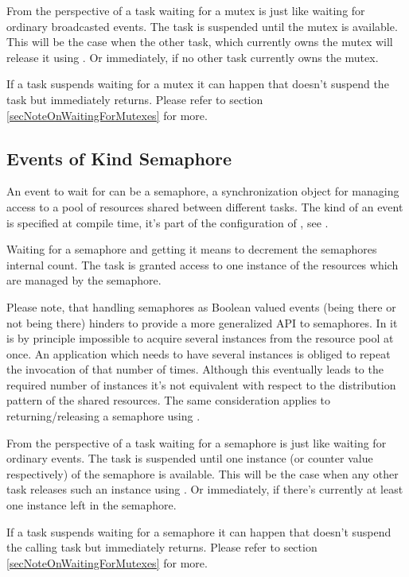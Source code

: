 From the perspective of a task waiting for a mutex is just like waiting
for ordinary broadcasted events. The task is suspended until the mutex is
available. This will be the case when the other task, which currently owns
the mutex will release it using . Or immediately, if
no other task currently owns the mutex.

If a task suspends waiting for a mutex it can happen that
 doesn't suspend the task but immediately
returns. Please refer to section \ref{secNoteOnWaitingForMutexes} for
more.


\subsection{Events of Kind Semaphore}
\label{secWaitForSemaphores}


An event to wait for can be a semaphore, a synchronization object for
managing access to a pool of resources shared between different tasks. The
kind of an event is specified at compile time, it's part of the
configuration of \rtos, see .

Waiting for a semaphore and getting it means to decrement the semaphores
internal count. The task is granted access to one instance of the
resources which are managed by the semaphore.

Please note, that handling semaphores as Boolean valued events (being
there or not being there) hinders to provide a more generalized API to
semaphores. In \rtos{} it is by principle impossible to acquire several
instances from the resource pool at once. An application which needs to
have several instances is obliged to repeat the invocation of
 that number of times. Although this eventually
leads to the required number of instances it's not equivalent with respect
to the distribution pattern of the shared resources. The same
consideration applies to returning/releasing a semaphore using
.

From the perspective of a task waiting for a semaphore is just like
waiting for ordinary events. The task is suspended until one instance (or
counter value respectively) of the semaphore is available. This will be
the case when any other task releases such an instance using
. Or immediately, if there's currently at least one
instance left in the semaphore.

If a task suspends waiting for a semaphore it can happen that
 doesn't suspend the calling task but
immediately returns. Please refer to section
\ref{secNoteOnWaitingForMutexes} for more.


